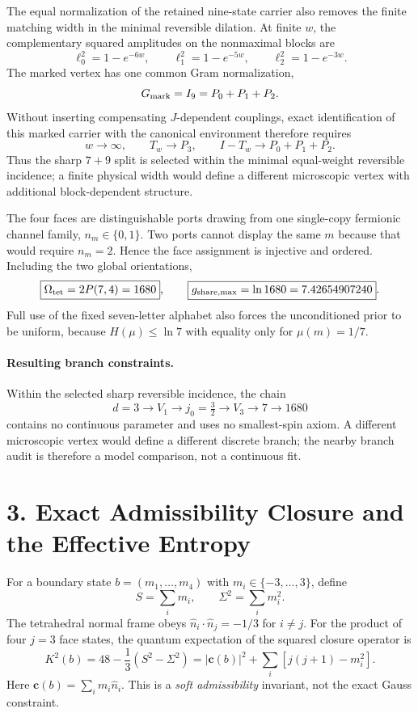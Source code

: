 \documentclass[11pt]{article}
\begin{document}
The equal normalization of the retained nine-state carrier also removes the finite matching width in the minimal reversible dilation. At finite $w$, the complementary squared amplitudes on the nonmaximal blocks are
\[
\ell_0^2=1-e^{-6w},\qquad
\ell_1^2=1-e^{-5w},\qquad
\ell_2^2=1-e^{-3w}.
\]
The marked vertex has one common Gram normalization,
\[
G_{\rm mark}=I_9=P_0+P_1+P_2.
\]
Without inserting compensating $J$-dependent couplings, exact identification of this marked carrier with the canonical environment therefore requires
\[
\boxed{w\to\infty,\qquad T_w\to P_3,\qquad I-T_w\to P_0+P_1+P_2}.
\]
Thus the sharp $7+9$ split is selected within the minimal equal-weight reversible incidence; a finite physical width would define a different microscopic vertex with additional block-dependent structure.

The four faces are distinguishable ports drawing from one single-copy fermionic channel family, $n_m\in\{0,1\}$. Two ports cannot display the same $m$ because that would require $n_m=2$. Hence the face assignment is injective and ordered. Including the two global orientations,
\[
\boxed{\Omega_{\rm tet}=2P(7,4)=1680},
\qquad
\boxed{g_{\rm share,max}=\ln1680=7.42654907240}.
\]
Full use of the fixed seven-letter alphabet also forces the unconditioned prior to be uniform, because $H(\mu)\le\ln7$ with equality only for $\mu(m)=1/7$.

\paragraph{Resulting branch constraints.}
Within the selected sharp reversible incidence, the chain
\[
d=3\to V_1\to j_0=\tfrac32\to V_3\to7\to 1680
\]
contains no continuous parameter and uses no smallest-spin axiom. A different microscopic vertex would define a different discrete branch; the nearby branch audit is therefore a model comparison, not a continuous fit.

\section{3. Exact Admissibility Closure and the Effective Entropy}

For a boundary state $b=(m_1,\ldots,m_4)$ with $m_i\in\{-3,\ldots,3\}$, define
\[
S=\sum_i m_i,
\qquad
\Sigma^2=\sum_i m_i^2.
\]
The tetrahedral normal frame obeys $\hat n_i\cdot\hat n_j=-1/3$ for $i\neq j$. For the product of four $j=3$ face states, the quantum expectation of the squared closure operator is
\[
\boxed{
K^2(b)=48-\frac13(S^2-\Sigma^2)
}
=|\mathbf c(b)|^2+
\sum_i\left[j(j+1)-m_i^2\right].
\]
Here $\mathbf c(b)=\sum_i m_i\hat n_i$. This is a \emph{soft admissibility} invariant, not the exact Gauss constraint.
\end{document}
